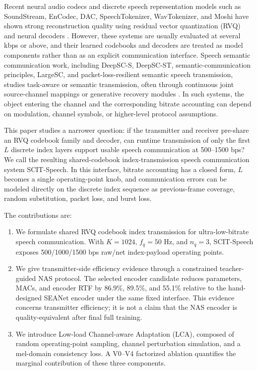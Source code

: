 \documentclass[10pt,twocolumn]{article}
\newcommand{\method}{SCIT-Speech}
\begin{document}
Recent neural audio codecs and discrete speech representation models such as SoundStream, EnCodec, DAC, SpeechTokenizer, WavTokenizer, and Moshi have shown strong reconstruction quality using residual vector quantization (RVQ) and neural decoders \cite{zeghidour2021soundstream,defossez2022encodec,kumar2023dac,zhang2023speechtokenizer,ji2024wavtokenizer,defossez2024moshi}. However, these systems are usually evaluated at several kbps or above, and their learned codebooks and decoders are treated as model components rather than as an explicit communication interface. Speech semantic communication work, including DeepSC-S, DeepSC-ST, semantic-communication principles, LargeSC, and packet-loss-resilient semantic speech transmission, studies task-aware or semantic transmission, often through continuous joint source-channel mappings or generative recovery modules \cite{weng2021deepscs,weng2022deepscst,qin2022semantic,tian2025largesc,han2025packetloss}. In such systems, the object entering the channel and the corresponding bitrate accounting can depend on modulation, channel symbols, or higher-level protocol assumptions.

This paper studies a narrower question: if the transmitter and receiver pre-share an RVQ codebook family and decoder, can runtime transmission of only the first \(L\) discrete index layers support usable speech communication at 500--1500 bps? We call the resulting shared-codebook index-transmission speech communication system \method. In this interface, bitrate accounting has a closed form, \(L\) becomes a single operating-point knob, and communication errors can be modeled directly on the discrete index sequence as previous-frame coverage, random substitution, packet loss, and burst loss.

The contributions are:
\begin{enumerate}[leftmargin=*,topsep=2pt,itemsep=1pt]
  \item We formulate shared RVQ codebook index transmission for ultra-low-bitrate speech communication. With \(K=1024\), \(f_q=50\) Hz, and \(n_q=3\), \method{} exposes 500/1000/1500 bps raw/net index-payload operating points.
  \item We give transmitter-side efficiency evidence through a constrained teacher-guided NAS protocol. The selected encoder candidate reduces parameters, MACs, and encoder RTF by 86.9\%, 89.5\%, and 55.1\% relative to the hand-designed SEANet encoder under the same fixed interface. This evidence concerns transmitter efficiency; it is not a claim that the NAS encoder is quality-equivalent after final full training.
  \item We introduce Low-load Channel-aware Adaptation (LCA), composed of random operating-point sampling, channel perturbation simulation, and a mel-domain consistency loss. A V0--V4 factorized ablation quantifies the marginal contribution of these three components.
\end{enumerate}
\end{document}
